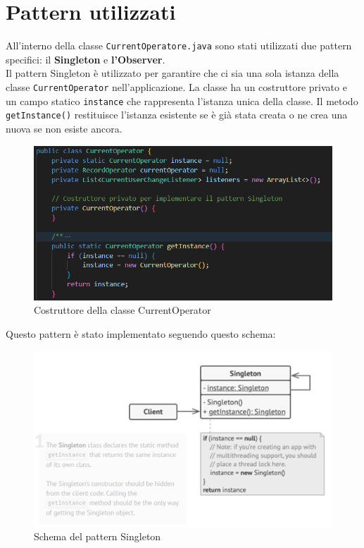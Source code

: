 \section{Pattern utilizzati}

All’interno della classe \texttt{CurrentOperatore.java} sono stati utilizzati due pattern specifici: il \textbf{Singleton} e \textbf{l’Observer}.\\
Il pattern Singleton è utilizzato per garantire che ci sia una sola istanza della classe \texttt{CurrentOperator} nell'applicazione. La classe ha un costruttore privato e un campo statico \texttt{instance}
che rappresenta l'istanza unica della classe. Il metodo \texttt{getInstance()} restituisce l'istanza esistente se è già stata creata o ne crea una nuova se non esiste ancora.
\begin{figure}[H]
    \centering
    \includegraphics[width=1\textwidth]{img/Singleton.png}
    \caption{Costruttore della classe CurrentOperator}
    \label{fig:Singleton}
    
\end{figure}

Questo pattern è stato implementato seguendo questo schema:
\begin{figure}[H]
    \centering
    \includegraphics[width=1\textwidth]{img/schema_singleton.png}
    \caption{Schema del pattern Singleton}
    \label{fig:SingletonPattern}
    
\end{figure}

